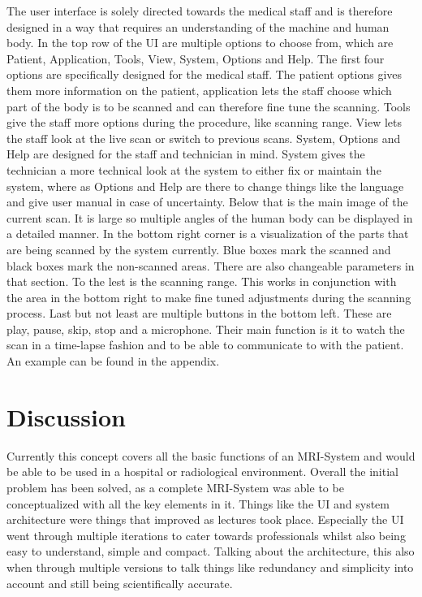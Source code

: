 \documentclass[conference]{IEEEtran}
\begin{document}
    The user interface is solely directed towards the medical staff and is therefore designed in a way that requires an understanding of the machine and human body.
    In the top row of the UI are multiple options to choose from, which are Patient, Application, Tools, View, System, Options and Help. The first four options are specifically designed for the medical staff. The patient options gives them more information on the patient, application lets the staff choose which part of the body is to be scanned and can therefore fine tune the scanning. Tools give the staff more options during the procedure, like scanning range. View lets the staff look at the live scan or switch to previous scans.
    System, Options and Help are designed for the staff and technician in mind. System gives the technician a more technical look at the system to either fix or maintain the system, where as Options and Help are there to change things like the language and give user manual in case of uncertainty.
    Below that is the main image of the current scan. It is large so multiple angles of the human body can be displayed in a detailed manner. In the bottom right corner is a visualization of the parts that are being scanned by the system currently. Blue boxes mark the scanned and black boxes mark the non-scanned areas. There are also changeable parameters in that section.
    To the lest is the scanning range. This works in conjunction with the area in the bottom right to make fine tuned adjustments during the scanning process.
    Last but not least are multiple buttons in the bottom left. These are play, pause, skip, stop and a microphone. Their main function is it to watch the scan in a time-lapse fashion and to be able to communicate to with the patient. An example can be found in the appendix.

\section{Discussion}

    Currently this concept covers all the basic functions of an MRI-System and would be able to be used in a hospital or radiological environment.
    Overall the initial problem has been solved, as a complete MRI-System was able to be conceptualized with all the key elements in it.
    Things like the UI and system architecture were things that improved as lectures took place. Especially the UI went through multiple iterations to cater towards professionals whilst also being easy to understand, simple and compact. Talking about the architecture, this also when through multiple versions to talk things like redundancy and simplicity into account and still being scientifically accurate.
    
\end{document}
